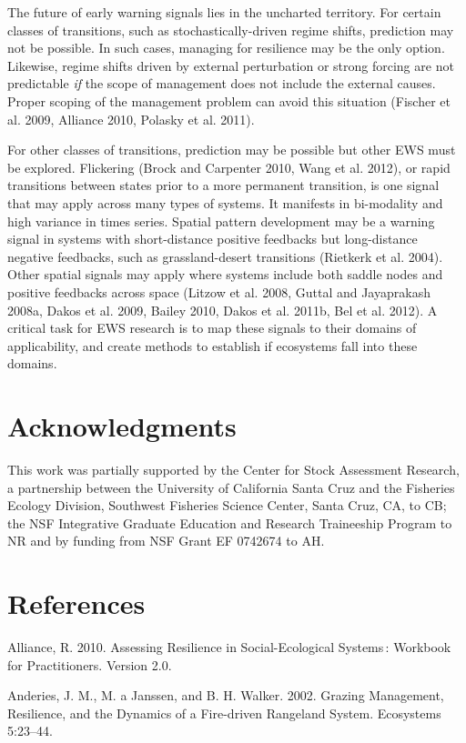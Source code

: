 \documentclass{article}
\begin{document}
The future of early warning signals lies in the uncharted territory. For
certain classes of transitions, such as stochastically-driven regime
shifts, prediction may not be possible. In such cases, managing for
resilience may be the only option. Likewise, regime shifts driven by
external perturbation or strong forcing are not predictable \emph{if}
the scope of management does not include the external causes. Proper
scoping of the management problem can avoid this situation (Fischer et
al. 2009, Alliance 2010, Polasky et al. 2011).

For other classes of transitions, prediction may be possible but other
EWS must be explored. Flickering (Brock and Carpenter 2010, Wang et al.
2012), or rapid transitions between states prior to a more permanent
transition, is one signal that may apply across many types of systems.
It manifests in bi-modality and high variance in times series. Spatial
pattern development may be a warning signal in systems with
short-distance positive feedbacks but long-distance negative feedbacks,
such as grassland-desert transitions (Rietkerk et al. 2004). Other
spatial signals may apply where systems include both saddle nodes and
positive feedbacks across space (Litzow et al. 2008, Guttal and
Jayaprakash 2008a, Dakos et al. 2009, Bailey 2010, Dakos et al. 2011b,
Bel et al. 2012). A critical task for EWS research is to map these
signals to their domains of applicability, and create methods to
establish if ecosystems fall into these domains.

\section{Acknowledgments}

This work was partially supported by the Center for Stock Assessment
Research, a partnership between the University of California Santa Cruz
and the Fisheries Ecology Division, Southwest Fisheries Science Center,
Santa Cruz, CA, to CB; the NSF Integrative Graduate Education and
Research Traineeship Program to NR and by funding from NSF Grant EF
0742674 to AH.

\section{References}

Alliance, R. 2010. Assessing Resilience in Social-Ecological Systems :
Workbook for Practitioners. Version 2.0.

Anderies, J. M., M. a Janssen, and B. H. Walker. 2002. Grazing
Management, Resilience, and the Dynamics of a Fire-driven Rangeland
System. Ecosystems 5:23--44.
\end{document}

